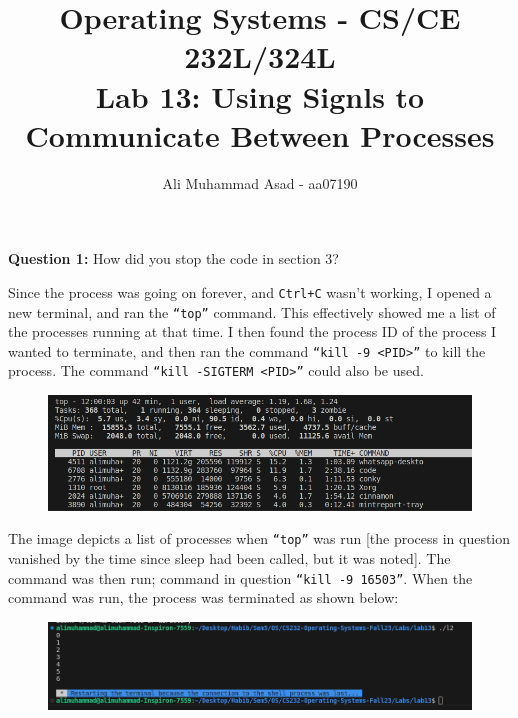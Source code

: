\documentclass[addpoints]{exam}
\title{Operating Systems - CS/CE 232L/324L\\ Lab 13: Using Signls to Communicate Between Processes}
\author{Ali Muhammad Asad - aa07190}
\date{} %
\begin{document}
\maketitle

\begin{center}
    \gradetable[h]
\end{center}

\vspace*{5mm}
\begin{questions}
    \question
    \textbf{Question 1:} How did you stop the code in section 3?
    \begin{solution}
        Since the process was going on forever, and \texttt{Ctrl+C} wasn't working, I opened a new terminal, and ran the \texttt{``top''} command. This effectively showed me a list of the processes running at that time. I then found the process ID of the process I wanted to terminate, and then ran the command \texttt{``kill -9 <PID>''} to kill the process. The command \texttt{``kill -SIGTERM <PID>''} could also be used.
        \begin{figure}[H]
            \centering
            \includegraphics[width=1.0\textwidth]{top.png}
        \end{figure}
        The image depicts a list of processes when \texttt{``top''} was run [the process in question vanished by the time since sleep had been called, but it was noted]. The command was then run; command in question \texttt{``kill -9 16503''}. When the command was run, the process was terminated as shown below: 
        \begin{figure}[H]
            \centering
            \includegraphics[width=1.0\textwidth]{end.png}
        \end{figure}
    \end{solution}


\end{questions}
\end{document}
